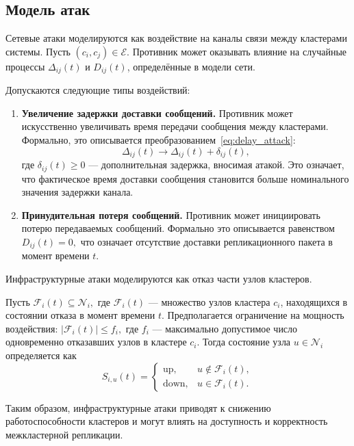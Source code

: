 \subsection{Модель атак}

Сетевые атаки моделируются как воздействие на каналы связи
между кластерами системы.
Пусть $(c_i, c_j) \in \mathcal{E}$.
Противник может оказывать влияние на случайные процессы
$\Delta_{ij}(t)$ и $D_{ij}(t)$, определённые в модели сети.

Допускаются следующие типы воздействий:

\begin{enumerate}
\item \textbf{Увеличение задержки доставки сообщений.}
Противник может искусственно увеличивать время передачи сообщения
между кластерами. Формально, это описывается преобразованием~\ref{eq:delay_attack}:
\begin{equation}
\Delta_{ij}(t) \rightarrow \Delta_{ij}(t) + \delta_{ij}(t),
\label{eq:delay_attack}
\end{equation}
где $\delta_{ij}(t) \ge 0$ --- дополнительная задержка,
вносимая атакой.
Это означает, что фактическое время доставки сообщения
становится больше номинального значения задержки канала.

\item \textbf{Принудительная потеря сообщений.}
Противник может инициировать потерю передаваемых сообщений.
Формально это описывается равенством
$
D_{ij}(t) = 0,
$
что означает отсутствие доставки репликационного пакета
в момент времени $t$.

\end{enumerate}

Инфраструктурные атаки моделируются как отказ части узлов кластеров.

Пусть
$
\mathcal{F}_i(t) \subseteq \mathcal{N}_i,
$
где $\mathcal{F}_i(t)$ --- множество узлов кластера $c_i$,
находящихся в состоянии отказа в момент времени $t$.
Предполагается ограничение на мощность воздействия:
$
|\mathcal{F}_i(t)| \le f_i,
$
где $f_i$ --- максимально допустимое число одновременно
отказавших узлов в кластере $c_i$. Тогда состояние узла $u \in \mathcal{N}_i$ определяется как
\[
S_{i,u}(t) =
\begin{cases}
\mathrm{up}, & u \notin \mathcal{F}_i(t),\\
\mathrm{down}, & u \in \mathcal{F}_i(t).
\end{cases}
\]

Таким образом, инфраструктурные атаки приводят к снижению
работоспособности кластеров и могут влиять на доступность
и корректность межкластерной репликации.

